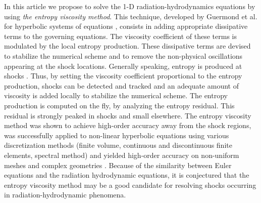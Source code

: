 \documentclass[review]{elsarticle}
\begin{document}
In this article we propose to solve the 1-D radiation-hydrodynamics equations by using \emph{the entropy viscosity method}. This technique, developed by Guermond et al.  for hyperbolic systems of equations \cite{jlg1, jlg2}, consists in adding appropriate dissipative terms to the governing equations.  The viscosity coefficient of these terms is modulated by the local entropy production. These dissipative terms are devised to stabilize the numerical scheme and to remove the non-physical oscillations appearing at the shock locations. Generally speaking, entropy is produced at shocks \cite{Toro}. Thus, by setting the viscosity coefficient proportional to the entropy production, shocks can be detected and tracked and an adequate amount of viscosity is added locally to stabilize the numerical scheme. The entropy production is computed on the fly, by analyzing the entropy residual. This residual is strongly peaked in shocks and small elsewhere. 
The entropy viscosity method was shown to achieve high-order accuracy away from the shock regions, was successfully applied to non-linear hyperbolic equations using various discretization methods (finite volume, continuous and discontinuous finite elements, spectral method) and yielded high-order accuracy on non-uniform meshes and complex geometries \cite{jlg2, valentin}. Because of the similarity between Euler equations and the radiation hydrodynamic equations, it is conjectured that the entropy viscosity method may be a good candidate for resolving shocks occurring in radiation-hydrodynamic phenomena.
\end{document}
